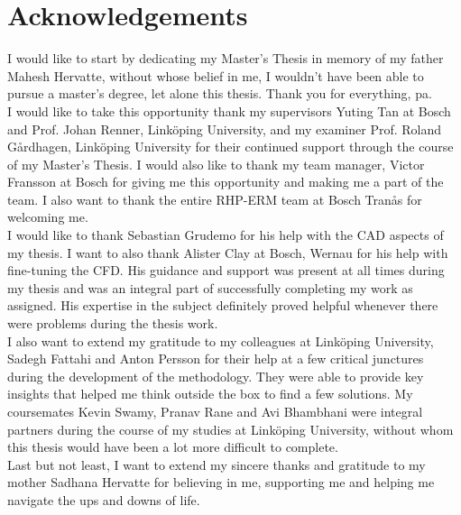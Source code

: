 \documentclass[11pt,a4paper,twoside,oneside]{article}
\begin{document}
\thispagestyle{plain}

\section*{Acknowledgements}

\vspace{.6cm}

I would like to start by dedicating my Master's Thesis in memory of my father Mahesh Hervatte, without whose belief in me, I wouldn't have been able to pursue a master's degree, let alone this thesis. Thank you for everything, pa.\\

I would like to take this opportunity thank my supervisors Yuting Tan at Bosch and Prof. Johan Renner, Link\"oping University, and my examiner Prof. Roland G\aa rdhagen, Link\"oping University for their continued support through the course of my Master's Thesis. I would also like to thank my team manager, Victor Fransson at Bosch for giving me this opportunity and making me a part of the team. I also want to thank the entire RHP-ERM team at Bosch Tran\aa s for welcoming me.\\

I would like to thank Sebastian Grudemo for his help with the CAD aspects of my thesis. I want to also thank Alister Clay at Bosch, Wernau for his help with fine-tuning the CFD. His guidance and support was present at all times during my thesis and was an integral part of successfully completing my work as assigned. His expertise in the subject definitely proved helpful whenever there were problems during the thesis work.\\

I also want to extend my gratitude to my colleagues at Link\"oping University, Sadegh Fattahi and Anton Persson for their help at a few critical junctures during the development of the methodology. They were able to provide key insights that helped me think outside the box to find a few solutions. My coursemates Kevin Swamy, Pranav Rane and Avi Bhambhani were integral partners  during the course of my studies at Link\"oping University, without whom this thesis would have been a lot more difficult to complete.\\

Last but not least, I want to extend my sincere thanks and gratitude to my mother Sadhana Hervatte for believing in me, supporting me and helping me navigate the ups and downs of life.\\
\end{document}
